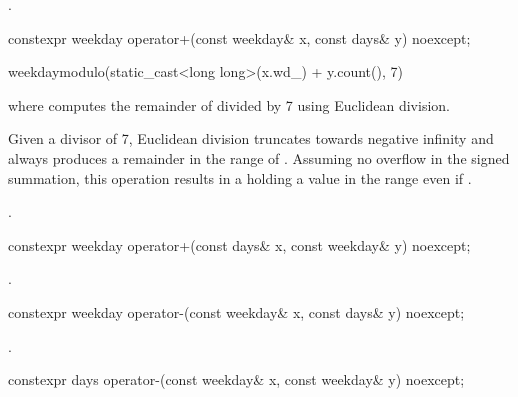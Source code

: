 \begin{itemdescr}
\pnum
\returns
{}.
\end{itemdescr}

%
\begin{itemdecl}
constexpr weekday operator+(const weekday& x, const days& y) noexcept;
\end{itemdecl}

\begin{itemdescr}
\pnum
\returns
\begin{codeblock}
weekday{modulo(static_cast<long long>(x.wd_) + y.count(), 7)}
\end{codeblock}
where  computes the remainder of  divided by 7 using Euclidean division.
\begin{note}
Given a divisor of 7, Euclidean division truncates towards negative infinity and
always produces a remainder in the range of .
Assuming no overflow in the signed summation,
this operation results in a  holding a value in the range  even if .
\end{note}
\begin{example}
.
\end{example}
\end{itemdescr}

%
\begin{itemdecl}
constexpr weekday operator+(const days& x, const weekday& y) noexcept;
\end{itemdecl}

\begin{itemdescr}
\pnum
\returns
{}.
\end{itemdescr}

%
\begin{itemdecl}
constexpr weekday operator-(const weekday& x, const days& y) noexcept;
\end{itemdecl}

\begin{itemdescr}
\pnum
\returns
{}.
\end{itemdescr}

%
\begin{itemdecl}
constexpr days operator-(const weekday& x, const weekday& y) noexcept;
\end{itemdecl}

